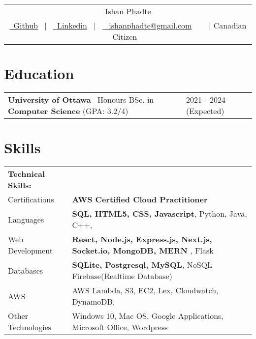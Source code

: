 \documentclass[a4paper,12pt]{article}
\begin{document}
\pagestyle{empty} 


\begin{tabularx}{\linewidth}{@{} C @{}}

\Huge{Ishan Phadte} \\[7pt]
\href{github.com/IshanPhadte776}{\raisebox{-0.10\height}\ Github} \ $|$ \ 
\href{linkedin.com/in/ishan-phadte}{\raisebox{-0.10\height}\ Linkedin} \ $|$ \ 
\href{ishanphadte@gmail.com}{\raisebox{-0.10\height} \ ishanphadte@gmail.com} \ 
\ {\raisebox{-0.10\height} \ $|$ Canadian Citizen} \ 

\end{tabularx}


\section{Education}
\begin{tabularx}{\linewidth}{@{}l X@{}}
\textbf{University of Ottawa} \
Honours BSc. in \textbf{Computer Science} (GPA: 3.2/4) & \hfill{2021 - 2024 (Expected)}
\end{tabularx}


\section{Skills}


\begin{tabularx}{\linewidth}{@{}l X@{}}
\textbf{Technical Skills:}\\
Certifications &  \normalsize{\textbf{AWS Certified Cloud Practitioner}}\\
Languages &  \normalsize{\textbf{SQL, HTML5, CSS, Javascript}, Python, Java, C++,}\\
Web Development &  \normalsize{\textbf{React, Node.js, Express.js, Next.js, Socket.io, MongoDB, MERN }, Flask}\\
Databases &  \normalsize{\textbf{SQLite, Postgresql, MySQL}, NoSQL Firebase(Realtime Database)}\\
AWS & \normalsize{AWS Lambda, S3, EC2, Lex, Cloudwatch, DynamoDB, } \\

Other Technologies & \normalsize{Windows 10, Mac OS, Google Applications, Microsoft Office, Wordpress} \\




\end{tabularx}
\end{document}
